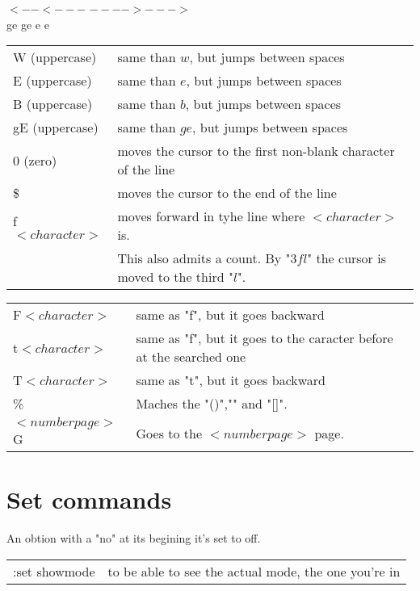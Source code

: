 \documentclass[11p]{book}
\begin{document}
\hspace*{4.2cm}$<--<---$ \hspace*{1cm } $---->--->$ \\
\hspace*{5.2cm} ge \hspace*{0.6cm} ge  \hspace*{2cm} e \hspace*{1cm} e\\


\begin{tabular}{p{2.8cm} p{13cm}}
W (uppercase) & same than $w$, but jumps between spaces \\
E (uppercase) & same than $e$, but jumps between spaces \\
B (uppercase) & same than $b$, but jumps between spaces \\
gE (uppercase) & same than $ge$, but jumps between spaces \\
\hline
0 (zero) & moves the cursor to the first non-blank character of the line \\
\$ & moves the cursor to the end of the line \\
f$<character>$ & moves forward in tyhe line where $<character>$ is. \\
 & This also admits a count. By "$3fl$" the cursor is moved to the third "$l$".\\
\end{tabular}
\newpage
\begin{tabular}{p{3cm} p{13cm}}
F$<character>$ & same as "f", but it goes backward \\
t$<character>$ & same as "f", but it goes to the caracter before at the searched one \\
T$<character>$ & same as "t", but it goes backward \\
\% & Maches the "()","{}" and "[]". \\
$<numberpage>$G & Goes to the $<numberpage>$ page. \\

\end{tabular}


\newpage
\section*{Set commands}
An obtion with a "no" at its begining it's set to off. \\

\begin{tabular}{p{4cm} l}
:set showmode & to be able to see the actual mode, the one you're in \\

\end{tabular}
\end{document}
